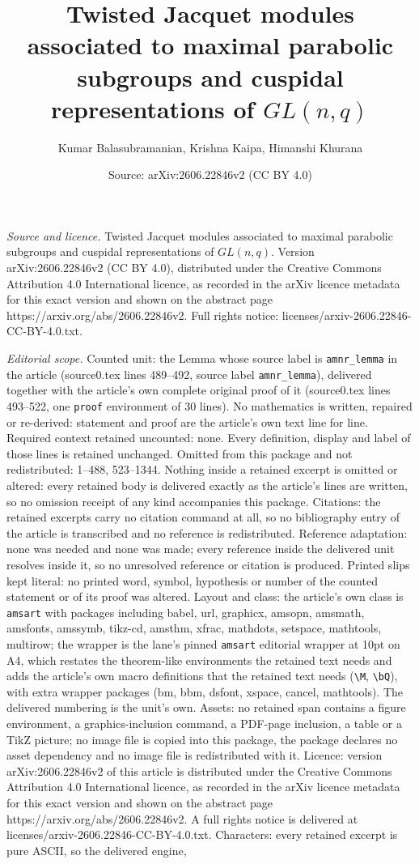 \documentclass[10pt,a4paper]{amsart}
\title[Twisted Jacquet modules associated to maximal parabolic subg]{Twisted Jacquet modules associated to maximal parabolic subgroups and cuspidal representations of $GL(n, q)$}
\author{Kumar Balasubramanian, Krishna Kaipa, Himanshi Khurana}
\date{Source: arXiv:2606.22846v2 (CC BY 4.0)}
\begin{document}
\maketitle

\noindent\emph{Source and licence.} Twisted Jacquet modules associated to maximal parabolic subgroups and cuspidal representations of $GL(n, q)$. Version arXiv:2606.22846v2 (CC BY 4.0), distributed under the Creative Commons Attribution 4.0 International licence, as recorded in the arXiv licence metadata for this exact version and shown on the abstract page https://arxiv.org/abs/2606.22846v2. Full rights notice: licenses/arxiv-2606.22846-CC-BY-4.0.txt.\par\smallskip

\noindent\textit{Editorial scope.} Counted unit: the Lemma whose source label is \texttt{amnr\_lemma} in the article (source0.tex lines 489--492, source label \texttt{amnr\_lemma}), delivered together with the article's own complete original proof of it (source0.tex lines 493--522, one \texttt{proof} environment of 30 lines). No mathematics is written, repaired or re-derived: statement and proof are the article's own text line for line. Required context retained uncounted: none. Every definition, display and label of those lines is retained unchanged. Omitted from this package and not redistributed: 1--488, 523--1344. Nothing inside a retained excerpt is omitted or altered: every retained body is delivered exactly as the article's lines are written, so no omission receipt of any kind accompanies this package. Citations: the retained excerpts carry no citation command at all, so no bibliography entry of the article is transcribed and no reference is redistributed. Reference adaptation: none was needed and none was made; every reference inside the delivered unit resolves inside it, so no unresolved reference or citation is produced. Printed slips kept literal: no printed word, symbol, hypothesis or number of the counted statement or of its proof was altered. Layout and class: the article's own class is \texttt{amsart} with packages including babel, url, graphicx, amsopn, amsmath, amsfonts, amssymb, tikz-cd, amsthm, xfrac, mathdots, setspace, mathtools, multirow; the wrapper is the lane's pinned \texttt{amsart} editorial wrapper at 10pt on A4, which restates the theorem-like environments the retained text needs and adds the article's own macro definitions that the retained text needs (\texttt{\textbackslash M}, \texttt{\textbackslash bQ}), with extra wrapper packages (bm, bbm, dsfont, xspace, cancel, mathtools). The delivered numbering is the unit's own. Assets: no retained span contains a figure environment, a graphics-inclusion command, a PDF-page inclusion, a table or a TikZ picture; no image file is copied into this package, the package declares no asset dependency and no image file is redistributed with it. Licence: version arXiv:2606.22846v2 of this article is distributed under the Creative Commons Attribution 4.0 International licence, as recorded in the arXiv licence metadata for this exact version and shown on the abstract page https://arxiv.org/abs/2606.22846v2. A full rights notice is delivered at licenses/arxiv-2606.22846-CC-BY-4.0.txt. Characters: every retained excerpt is pure ASCII, so the delivered engine, 
\end{document}
